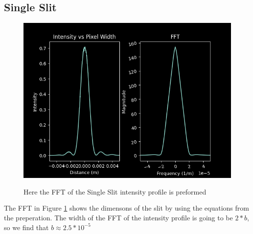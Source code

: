 \documentclass{article}
\begin{document}
\subsection{Single Slit}
\begin{figure}[h]
  \caption{Here the FFT of the Single Slit intensity profile is preformed}
  \centering
  \includegraphics[scale=0.6]{ES1_2graph.png}
  \label{singleslit}

\end{figure}
The FFT in Figure \ref{singleslit} shows the dimensons of the slit by using the equations from the preperation. The width of the FFT of the intensity profile is going to be $2*b$, so we find that $b\approx 2.5*10^{-5}$
\end{document}
